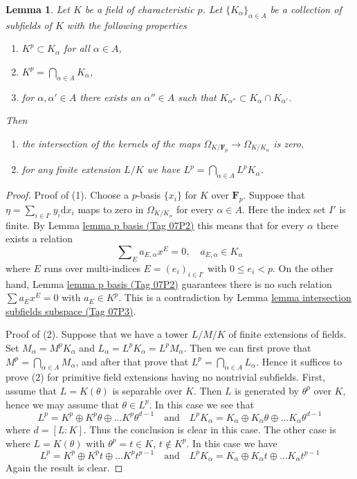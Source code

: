 \documentclass{amsart}
\theoremstyle{plain}
\newtheorem{lemma}[subsection]{Lemma}
\theoremstyle{definition}
\theoremstyle{remark}
\numberwithin{equation}{subsection}
\begin{document}
\begin{lemma}
\label{lemma-intersection-subfields}
Let $K$ be a field of characteristic $p$. Let $\{K_\alpha\}_{\alpha \in A}$
be a collection of subfields of $K$ with the following properties
\begin{enumerate}
\item $K^p \subset K_\alpha$ for all $\alpha \in A$,
\item $K^p = \bigcap_{\alpha \in A} K_\alpha$,
\item for $\alpha, \alpha' \in A$ there exists an $\alpha'' \in A$
such that $K_{\alpha''} \subset K_\alpha \cap K_{\alpha'}$.
\end{enumerate}
Then
\begin{enumerate}
\item the intersection of the kernels of the maps
$\Omega_{K/\mathbf{F}_p} \to \Omega_{K/K_\alpha}$ is zero,
\item for any finite extension $L/K$ we have
$L^p = \bigcap_{\alpha \in A} L^pK_\alpha$.
\end{enumerate}
\end{lemma}

\begin{proof}
Proof of (1).
Choose a $p$-basis $\{x_i\}$ for $K$ over $\mathbf{F}_p$.
Suppose that $\eta = \sum_{i \in I'} y_i \text{d}x_i$ maps to zero in
$\Omega_{K/K_\alpha}$ for every $\alpha \in A$. Here the index set
$I'$ is finite. By Lemma \href{https://stacks.math.columbia.edu/tag/07P2}{lemma p basis (Tag 07P2)}
this means that for every $\alpha$ there exists a relation
$$
\sum\nolimits_E a_{E, \alpha} x^E = 0,\quad a_{E, \alpha} \in K_\alpha
$$
where $E$ runs over multi-indices $E = (e_i)_{i \in I'}$ with
$0 \leq e_i < p$. On the other hand, Lemma \href{https://stacks.math.columbia.edu/tag/07P2}{lemma p basis (Tag 07P2)}
guarantees there is no such relation $\sum a_E x^E = 0$ with
$a_E \in K^p$. This is a contradiction by
Lemma \href{https://stacks.math.columbia.edu/tag/07P3}{lemma intersection subfields subspace (Tag 07P3)}.

\medskip\noindent
Proof of (2). Suppose that we have a tower $L/M/K$
of finite extensions of fields. Set $M_\alpha = M^p K_\alpha$
and $L_\alpha = L^p K_\alpha = L^p M_\alpha$. Then we can first prove that
$M^p = \bigcap_{\alpha \in A} M_\alpha$, and after that prove
that $L^p = \bigcap_{\alpha \in A} L_\alpha$. Hence it suffices to
prove (2) for primitive field extensions having no nontrivial subfields.
First, assume that $L = K(\theta)$ is separable over $K$. Then
$L$ is generated by $\theta^p$ over $K$, hence we may assume that
$\theta \in L^p$. In this case we see that
$$
L^p = K^p \oplus K^p\theta \oplus \ldots K^p\theta^{d - 1}
\quad\text{and}\quad
L^pK_\alpha =
K_\alpha \oplus K_\alpha \theta \oplus \ldots K_\alpha\theta^{d - 1}
$$
where $d = [L : K]$. Thus the conclusion is clear in this case. The other
case is where $L = K(\theta)$ with $\theta^p = t \in K$, $t \not \in K^p$.
In this case we have
$$
L^p = K^p \oplus K^pt \oplus \ldots K^pt^{p - 1}
\quad\text{and}\quad
L^pK_\alpha =
K_\alpha \oplus K_\alpha t \oplus \ldots K_\alpha t^{p - 1}
$$
Again the result is clear.
\end{proof}
\end{document}
